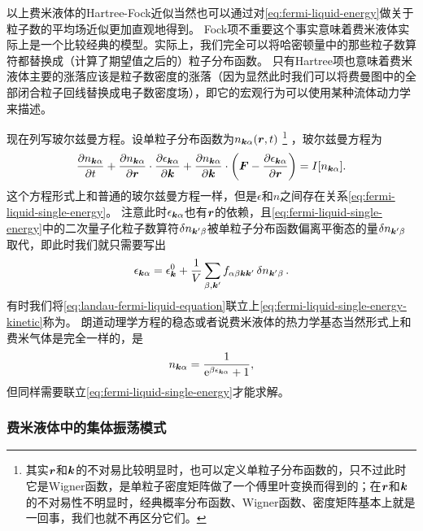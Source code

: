以上费米液体的Hartree-Fock近似当然也可以通过对\eqref{eq:fermi-liquid-energy}做关于粒子数的平均场近似更加直观地得到。
Fock项不重要这个事实意味着费米液体实际上是一个比较经典的模型。实际上，我们完全可以将哈密顿量中的那些粒子数算符都替换成（计算了期望值之后的）粒子分布函数。
只有Hartree项也意味着费米液体主要的涨落应该是粒子数密度的涨落（因为显然此时我们可以将费曼图中的全部闭合粒子回线替换成电子数密度场），即它的宏观行为可以使用某种流体动力学来描述。

现在列写玻尔兹曼方程。设单粒子分布函数为$n_{\vb*{k} \alpha}(\vb*{r}, t)$%
\footnote{
    其实$\vb*{r}$和$\vb*{k}$的不对易比较明显时，也可以定义单粒子分布函数的，只不过此时它是Wigner函数，是单粒子密度矩阵做了一个傅里叶变换而得到的；在$\vb*{r}$和$\vb*{k}$的不对易性不明显时，经典概率分布函数、Wigner函数、密度矩阵基本上就是一回事，我们也就不再区分它们。
}%
，玻尔兹曼方程为
\begin{equation}
    \pdv{n_{\vb*{k} \alpha}}{t} + \pdv{n_{\vb*{k} \alpha}}{\vb*{r}} \cdot \pdv{\epsilon_{\vb*{k} \alpha}}{\vb*{k}} + \pdv{n_{\vb*{k} \alpha}}{\vb*{k}} \cdot \left( \vb*{F} - \pdv{\epsilon_{\vb*{k} \alpha}}{\vb*{r}} \right) = I[n_{\vb*{k} \alpha}]. 
    \label{eq:landau-fermi-liquid-equation}
\end{equation}
这个方程形式上和普通的玻尔兹曼方程一样，但是$\epsilon$和$n$之间存在关系\eqref{eq:fermi-liquid-single-energy}。
注意此时$\epsilon_{\vb*{k} \alpha}$也有$\vb*{r}$的依赖，且\eqref{eq:fermi-liquid-single-energy}中的二次量子化粒子数算符$\var{n_{\vb*{k}' \beta}}$被单粒子分布函数偏离平衡态的量$\var{n_{\vb*{k}' \beta}}$取代，即此时我们就只需要写出
\begin{equation}
    \epsilon_{\vb*{k} \alpha} = \epsilon_{\vb*{k}}^0 + \frac{1}{V} \sum_{\beta, \vb*{k}'} f_{\alpha \beta \vb*{k} \vb*{k}'} \var{n_{\vb*{k}' \beta}}.
    \label{eq:fermi-liquid-single-energy-kinetic}
\end{equation}
有时我们将\eqref{eq:landau-fermi-liquid-equation}联立上\eqref{eq:fermi-liquid-single-energy-kinetic}称为。
朗道动理学方程的稳态或者说费米液体的热力学基态当然形式上和费米气体是完全一样的，是
\begin{equation}
    n_{\vb*{k} \alpha} = \frac{1}{\mathrm{e}^{\beta \epsilon_{\vb*{k} \alpha}} + 1},
    \label{eq:fermi-liquid-stable-state}
\end{equation}
但同样需要联立\eqref{eq:fermi-liquid-single-energy}才能求解。

\subsubsection{费米液体中的集体振荡模式}

